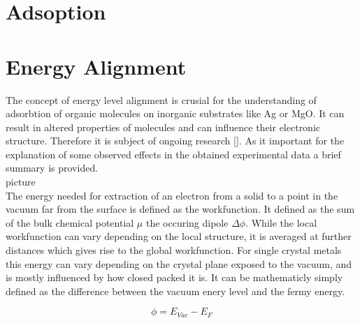 
%        
%





\section{Adsoption}

\section{Energy Alignment}
The concept of energy level alignment is crusial for the understanding of adsorbtion of organic molecules on inorganic substrates like Ag or MgO.
It can result in altered properties of molecules and can influence their electronic structure.
Therefore it is subject of ongoing research [\cite{braun2009energy}].
As it important for the explanation of some observed effects in the obtained experimental data a brief summary is provided.\\
picture \\
The energy needed for extraction of an electron from a solid to a point in the vacuum far from the surface is defined as the workfunction. 
It defined as the sum of the bulk chemical potential $\mu$ the occuring dipole $\Delta \phi$.
While the local workfunction can vary depending on the local structure, it is averaged at further distances which gives rise to the global workfunction.
For single crystal metals this energy can vary depending on the crystal plane exposed to the vacuum, and is mostly influenced by how closed packed it is.
It can be mathematicly simply defined as the difference between the vacuum enery level and the fermy energy.

\begin{equation}
    \phi = E_{Vac} - E_F
\end{equation}

\newpage